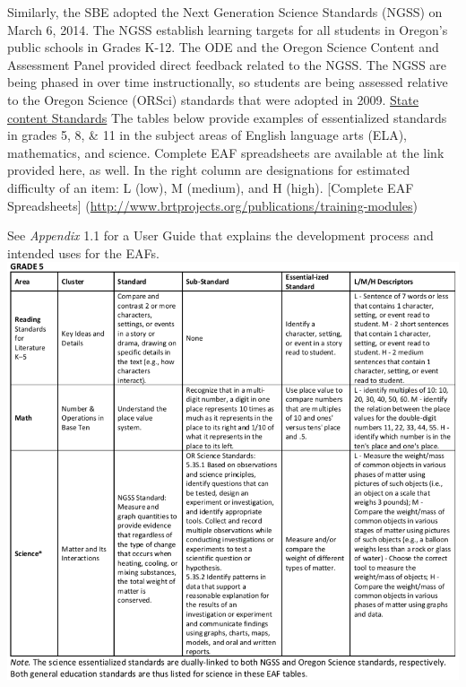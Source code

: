 \documentclass[]{article}
\begin{document}
Similarly, the SBE adopted the Next Generation Science Standards (NGSS)
on March 6, 2014. The NGSS establish learning targets for all students
in Oregon's public schools in Grades K-12. The ODE and the Oregon
Science Content and Assessment Panel provided direct feedback related to
the NGSS. The NGSS are being phased in over time instructionally, so
students are being assessed relative to the Oregon Science (ORSci)
standards that were adopted in 2009. \color{link}
\href{http://www.oregon.gov/ode/educator-resources/standards/Pages/default.aspx.}{State
content Standards} \color{black} The tables below provide examples of
essentialized standards in grades 5, 8, \& 11 in the subject areas of
English language arts (ELA), mathematics, and science. Complete EAF
spreadsheets are available at the link provided here, as well. In the
right column are designations for estimated difficulty of an item: L
(low), M (medium), and H (high). \color{link} {[}Complete EAF
Spreadsheets{]}
(\url{http://www.brtprojects.org/publications/training-modules})
\color{black}

See \emph{Appendix} 1.1 for a User Guide that explains the development
process and intended uses for the EAFs. \FloatBarrier
\includegraphics{Figures/Standards/Grade5.png}
\end{document}
